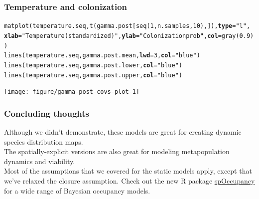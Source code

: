 \documentclass[color=usenames,dvipsnames]{beamer}\usepackage[]{graphicx}\usepackage[]{xcolor}
\makeatletter
\newcommand{\hlnum}[1]{\textcolor[rgb]{0.69,0.494,0}{#1}}%
\newcommand{\hlsng}[1]{\textcolor[rgb]{0.749,0.012,0.012}{#1}}%
\newcommand{\hldef}[1]{\textcolor[rgb]{0,0,0}{#1}}%
\newcommand{\hlkwc}[1]{\textcolor[rgb]{0,0,0}{\textbf{#1}}}%
\newcommand{\hlkwd}[1]{\textcolor[rgb]{0.004,0.004,0.506}{#1}}%
\newenvironment{kframe}{%
 \def\at@end@of@kframe{}%
 \ifinner\ifhmode%
  \def\at@end@of@kframe{\end{minipage}}%
  \begin{minipage}{\columnwidth}%
 \fi\fi%
 \def\FrameCommand##1{\hskip\@totalleftmargin \hskip-\fboxsep
 \colorbox{shadecolor}{##1}\hskip-\fboxsep
     \hskip-\linewidth \hskip-\@totalleftmargin \hskip\columnwidth}%
 \MakeFramed {\advance\hsize-\width
   \@totalleftmargin\z@ \linewidth\hsize
   \@setminipage}}%
 {\par\unskip\endMakeFramed%
 \at@end@of@kframe}
\newenvironment{knitrout}{}{} %
\makeatother
\begin{document}
\begin{frame}[fragile]
  \frametitle{Temperature and colonization}
\begin{knitrout}\scriptsize
{}\color{fgcolor}\begin{kframe}
\begin{alltt}
\hlkwd{matplot}\hldef{(temperature.seq,} \hlkwd{t}\hldef{(gamma.post[}\hlkwd{seq}\hldef{(}\hlnum{1}\hldef{,n.samples,}\hlnum{10}\hldef{),]),} \hlkwc{type}\hldef{=}\hlsng{"l"}\hldef{,}
        \hlkwc{xlab}\hldef{=}\hlsng{"Temperature (standardized)"}\hldef{,} \hlkwc{ylab}\hldef{=}\hlsng{"Colonization prob"}\hldef{,} \hlkwc{col}\hldef{=}\hlkwd{gray}\hldef{(}\hlnum{0.9}\hldef{))}
\hlkwd{lines}\hldef{(temperature.seq, gamma.post.mean,} \hlkwc{lwd}\hldef{=}\hlnum{3}\hldef{,} \hlkwc{col}\hldef{=}\hlsng{"blue"}\hldef{)}
\hlkwd{lines}\hldef{(temperature.seq, gamma.post.lower,} \hlkwc{col}\hldef{=}\hlsng{"blue"}\hldef{)}
\hlkwd{lines}\hldef{(temperature.seq, gamma.post.upper,} \hlkwc{col}\hldef{=}\hlsng{"blue"}\hldef{)}
\end{alltt}
\end{kframe}

{\centering \texttt{[image: figure/gamma-post-covs-plot-1]} 

}


\end{knitrout}
\end{frame}







\begin{frame}
  \frametitle{Concluding thoughts}
  Although we didn't demonstrate, these models are great for creating
  dynamic species distribution maps. \\
  \pause
  \vfill
  The spatially-explicit versions are also great for modeling
  metapopulation dynamics and viability. \\
  \pause
  \vfill
  Most of the assumptions that we covered for the static models apply,
  except that we've relaxed the closure assumption.
  \pause
  \vfill
  Check out the new R package
  \href{https://www.jeffdoser.com/files/spoccupancy-web/}{spOccupancy}
  for a wide range of Bayesian occupancy models.
\end{frame}
\end{document}
